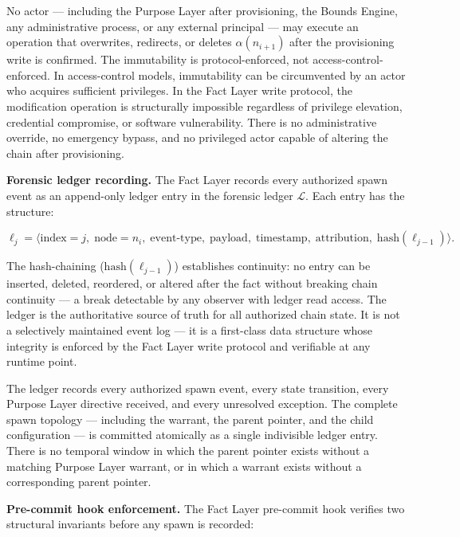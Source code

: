 No actor — including the Purpose Layer after provisioning, the Bounds Engine, any administrative process, or any external principal — may execute an operation that overwrites, redirects, or deletes $\alpha(n_{i+1})$ after the provisioning write is confirmed. The immutability is protocol-enforced, not access-control-enforced. In access-control models, immutability can be circumvented by an actor who acquires sufficient privileges. In the Fact Layer write protocol, the modification operation is structurally impossible regardless of privilege elevation, credential compromise, or software vulnerability. There is no administrative override, no emergency bypass, and no privileged actor capable of altering the chain after provisioning.

\medskip
\noindent\textbf{Forensic ledger recording.} The Fact Layer records every authorized spawn event as an append-only ledger entry in the forensic ledger $\mathcal{L}$. Each entry has the structure:

\begin{equation}
\ell_j = \bigl\langle
\text{index}=j,\;
\text{node}=n_i,\;
\text{event-type},\;
\text{payload},\;
\text{timestamp},\;
\text{attribution},\;
\text{hash}(\ell_{j-1})
\bigr\rangle .
\label{eq:rs-ledger-entry}
\end{equation}

The hash-chaining ($\text{hash}(\ell_{j-1})$) establishes continuity: no entry can be inserted, deleted, reordered, or altered after the fact without breaking chain continuity — a break detectable by any observer with ledger read access. The ledger is the authoritative source of truth for all authorized chain state. It is not a selectively maintained event log — it is a first-class data structure whose integrity is enforced by the Fact Layer write protocol and verifiable at any runtime point.

The ledger records every authorized spawn event, every state transition, every Purpose Layer directive received, and every unresolved exception. The complete spawn topology — including the warrant, the parent pointer, and the child configuration — is committed atomically as a single indivisible ledger entry. There is no temporal window in which the parent pointer exists without a matching Purpose Layer warrant, or in which a warrant exists without a corresponding parent pointer.

\medskip
\noindent\textbf{Pre-commit hook enforcement.} The Fact Layer pre-commit hook verifies two structural invariants before any spawn is recorded:

